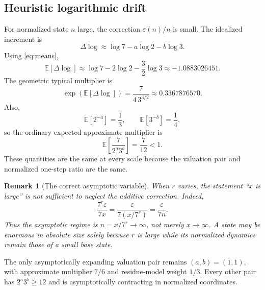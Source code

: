 \documentclass[11pt]{article}
\newtheorem{remark}[theorem]{Remark}
\newcommand{\eps}{\varepsilon}
\begin{document}
\subsection{Heuristic logarithmic drift}
For normalized state $n$ large, the correction $\eps(n)/n$ is small. The idealized increment is
\[
\Delta\log\approx\log7-a\log2-b\log3.
\]
Using \eqref{eq:means},
\begin{equation}
\mathbb E[\Delta\log]
\approx\log7-2\log2-\frac32\log3
\approx-1.0883026451.
\label{eq:drift}
\end{equation}
The geometric typical multiplier is
\begin{equation}
\exp(\mathbb E[\Delta\log])
=\frac{7}{4\,3^{3/2}}
\approx0.3367876570.
\label{eq:geomult}
\end{equation}
Also,
\[
\mathbb E[2^{-a}]=\frac13,
\qquad
\mathbb E[3^{-b}]=\frac14,
\]
so the ordinary expected approximate multiplier is
\begin{equation}
\mathbb E\!\left[\frac{7}{2^a3^b}\right]=\frac7{12}<1.
\label{eq:ordinarymult}
\end{equation}
These quantities are the same at every scale because the valuation pair and normalized one-step ratio are the same.

\begin{remark}[The correct asymptotic variable]
When $r$ varies, the statement ``$x$ is large'' is not sufficient to neglect the additive correction. Indeed,
\begin{equation}
\frac{7^r\eps}{7x}=\frac{\eps}{7(x/7^r)}=\frac{\eps}{7n}.
\label{eq:asympcorrection}
\end{equation}
Thus the asymptotic regime is $n=x/7^r\to\infty$, not merely $x\to\infty$. A state may be enormous in absolute size solely because $r$ is large while its normalized dynamics remain those of a small base state.
\end{remark}

The only asymptotically expanding valuation pair remains $(a,b)=(1,1)$, with approximate multiplier $7/6$ and residue-model weight $1/3$. Every other pair has $2^a3^b\ge12$ and is asymptotically contracting in normalized coordinates.
\end{document}
